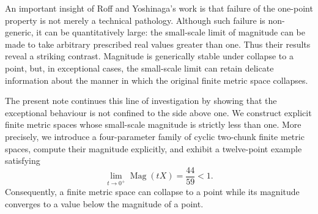 \documentclass[11pt]{amsart}
\numberwithin{equation}{section}
\theoremstyle{definition}
\theoremstyle{remark}
\DeclareMathOperator{\Mag}{Mag}
\begin{document}
An important insight of Roff and Yoshinaga's work is that failure of the
one-point property is not merely a technical pathology.  Although such
failure is non-generic, it can be quantitatively large: the small-scale
limit of magnitude can be made to take arbitrary prescribed real values
greater than one.  Thus their results reveal a striking contrast.  Magnitude
is generically stable under collapse to a point, but, in exceptional cases,
the small-scale limit can retain delicate information about the manner in
which the original finite metric space collapses.

The present note continues this line of investigation by showing that the
exceptional behaviour is not confined to the side above one.  We construct
explicit finite metric spaces whose small-scale magnitude is strictly less
than one.  More precisely, we introduce a four-parameter family of cyclic
two-chunk finite metric spaces, compute their magnitude explicitly, and
exhibit a twelve-point example satisfying
\[
\lim_{t\to 0^+}\Mag(tX)=\frac{44}{59}<1.
\]
Consequently, a finite metric space can collapse to a point while its
magnitude converges to a value below the magnitude of a point.
\end{document}
